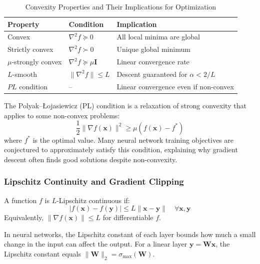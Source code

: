 \begin{table}[ht]
    \centering
    \caption{Convexity Properties and Their Implications for Optimization}
    \begin{tabular}{L{3.5cm} L{4cm} L{5cm}}
        \toprule
        \textbf{Property} & \textbf{Condition} & \textbf{Implication} \\
        \midrule
        Convex & $\nabla^2 f \succeq 0$ & All local minima are global \\
        Strictly convex & $\nabla^2 f \succ 0$ & Unique global minimum \\
        $\mu$-strongly convex & $\nabla^2 f \succeq \mu\mathbf{I}$ & Linear convergence rate \\
        $L$-smooth & $\|\nabla^2 f\| \leq L$ & Descent guaranteed for $\alpha < 2/L$ \\
        $PL$ condition & -- & Linear convergence even if non-convex \\
        \bottomrule
    \end{tabular}
\end{table}

The Polyak--\L{}ojasiewicz (PL) condition is a relaxation of strong convexity that applies to some non-convex problems:
\begin{equation}
\frac{1}{2}\|\nabla f(\mathbf{x})\|^2 \geq \mu(f(\mathbf{x}) - f^*)
\end{equation}
where $f^*$ is the optimal value. Many neural network training objectives are conjectured to approximately satisfy this condition, explaining why gradient descent often finds good solutions despite non-convexity.

\subsubsection{Lipschitz Continuity and Gradient Clipping}

\begin{definition}
A function $f$ is $L$-Lipschitz continuous if:
\begin{equation}
|f(\mathbf{x}) - f(\mathbf{y})| \leq L\|\mathbf{x} - \mathbf{y}\| \quad \forall \mathbf{x}, \mathbf{y}
\end{equation}
Equivalently, $\|\nabla f(\mathbf{x})\| \leq L$ for differentiable $f$.
\end{definition}

In neural networks, the Lipschitz constant of each layer bounds how much a small change in the input can affect the output. For a linear layer $\mathbf{y} = \mathbf{W}\mathbf{x}$, the Lipschitz constant equals $\|\mathbf{W}\|_2 = \sigma_{\max}(\mathbf{W})$.

